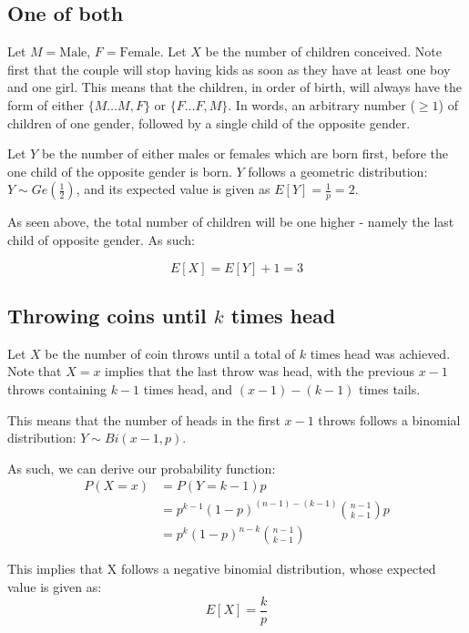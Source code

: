 \documentclass[a4paper]{scrreprt}
\begin{document}
\subsection{One of both}

Let $M = \text{Male}$, $F = \text{Female}$. Let $X$ be the number of children
conceived. Note first that the couple will stop having kids as soon as they
have at least one boy and one girl. This means that the children, in order of
birth, will always have the form of either $\{M \ldots M, F\}$ or $\{F \ldots
F, M\}$. In words, an arbitrary number ($\geq 1$) of children of one gender,
followed by a single child of the opposite gender.

Let $Y$ be the number of either males or females which are born first, before
the one child of the opposite gender is born. $Y$ follows a geometric
distribution: $Y \sim Ge\left(\frac{1}{2}\right)$, and its expected value is
given as $E[Y] = \frac{1}{p} = 2$.

As seen above, the total number of children will be one higher - namely the
last child of opposite gender. As such:

\[
	E[X] = E[Y] + 1 = 3
\]

\subsection{Throwing coins until $k$ times head}

Let $X$ be the number of coin throws until a total of $k$ times head was
achieved. Note that $X=x$ implies that the last throw was head, with the
previous $x-1$ throws containing $k-1$ times head, and $(x-1)-(k-1)$ times
tails.

This means that the number of heads in the first $x-1$ throws follows a
binomial distribution: $Y \sim Bi(x-1, p)$.

As such, we can derive our probability function:
\begin{align*}
	P(X=x) & = P(Y = k-1) p \\
	       & = p^{k-1} (1-p)^{(n-1) - (k-1)} \binom{n-1}{k-1} p \\
	       & = p^k (1-p)^{n-k} \binom{n-1}{k-1}
\end{align*}

This implies that X follows a negative binomial distribution, whose expected value is given as:
\[
	E[X] = \frac{k}{p}
\]
\end{document}
